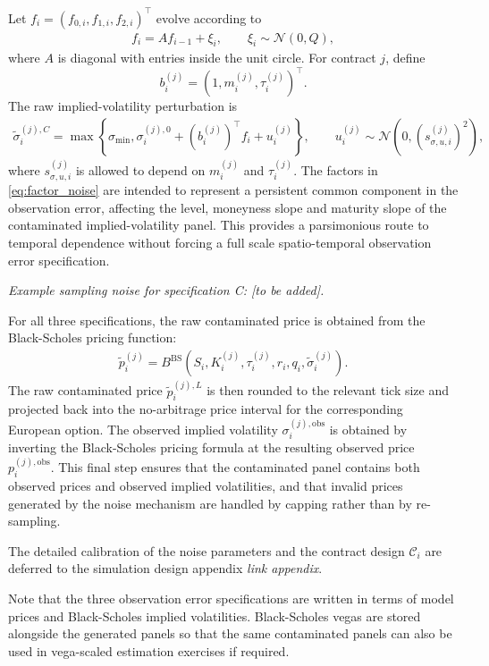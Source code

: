 \documentclass[11pt,a4paper,notitlepage]{article}
\numberwithin{equation}{section}
\begin{document}
Let
$f_i=(f_{0,i},f_{1,i},f_{2,i})^\top$ evolve according to
\begin{align}
f_i=A f_{i-1}+\xi_i,
\qquad
\xi_i\sim\mathcal{N}(0,Q),
\label{eq:factor_noise}
\end{align}
where $A$ is diagonal with entries inside the unit circle. For contract $j$, define
\[
b_i^{(j)}
=
\left(1,m_i^{(j)},\tau_i^{(j)}\right)^\top.
\]
The raw implied-volatility perturbation is
\begin{align}
\tilde\sigma_i^{(j),C}
=
\max\left\{
\sigma_{\min},
\sigma_i^{(j),0}
+
\left(b_i^{(j)}\right)^\top f_i
+
u_i^{(j)}
\right\},
\qquad
u_i^{(j)}\sim\mathcal{N}\left(0,\left(s_{\sigma,u,i}^{(j)}\right)^2\right),
\label{eq:factor_iv_noise}
\end{align}
where $s_{\sigma,u,i}^{(j)}$ is allowed to depend on $m_i^{(j)}$ and $\tau_i^{(j)}$. The factors in \eqref{eq:factor_noise} are intended to represent a persistent common component in the observation error, affecting the level, moneyness slope and maturity slope of the contaminated implied-volatility panel. This provides a parsimonious route to temporal dependence without forcing a full scale spatio-temporal observation error specification.

\emph{Example sampling noise for specification C: [to be added].}

For all three specifications, the raw contaminated price is obtained from the Black-Scholes pricing function:
\begin{align}
\tilde p_i^{(j)}
=
B^{\mathrm{BS}}
\left(
S_i,K_i^{(j)},\tau_i^{(j)},r_i,q_i,\tilde\sigma_i^{(j)}
\right).
\label{eq:raw_contaminated_price}
\end{align}
The raw contaminated price $\tilde p_i^{(j),L}$ is then rounded to the relevant tick size and projected back into the no-arbitrage price interval for the corresponding European option. The observed implied volatility $\sigma_i^{(j),\mathrm{obs}}$ is obtained by inverting the Black-Scholes pricing formula at the resulting observed price $p_i^{(j),\mathrm{obs}}$. This final step ensures that the contaminated panel contains both observed prices and observed implied volatilities, and that invalid prices generated by the noise mechanism are handled by capping rather than by re-sampling.

The detailed calibration of the noise parameters and the contract design $\mathcal{C}_i$ are deferred to the simulation design appendix \emph{link appendix}.

Note that the three observation error specifications are written in terms of model prices and Black-Scholes implied volatilities. Black-Scholes vegas are stored alongside the generated panels so that the same contaminated panels can also be used in vega-scaled estimation exercises if required.
 
\end{document}
